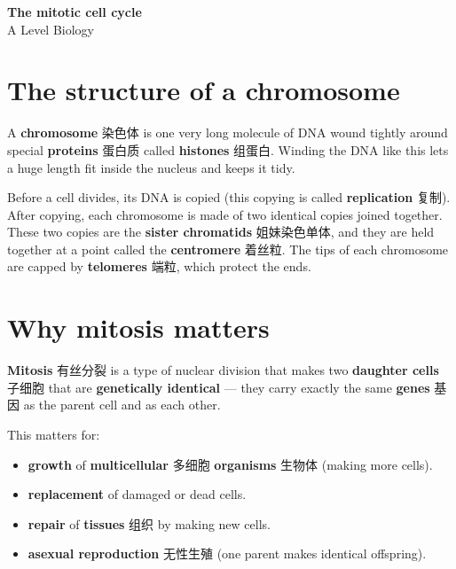 \documentclass[11pt]{article}
\begin{document}
\begin{center}
  {\LARGE\bfseries The mitotic cell cycle}\\[0.35em]
  {\large A Level Biology}
\end{center}
\vspace{0.6em}

\section*{The structure of a chromosome}

A \textbf{chromosome} 染色体 is one very long molecule of DNA wound tightly around special \textbf{proteins} 蛋白质 called \textbf{histones} 组蛋白. Winding the DNA like this lets a huge length fit inside the nucleus and keeps it tidy.

Before a cell divides, its DNA is copied (this copying is called \textbf{replication} 复制). After copying, each chromosome is made of two identical copies joined together. These two copies are the \textbf{sister chromatids} 姐妹染色单体, and they are held together at a point called the \textbf{centromere} 着丝粒. The tips of each chromosome are capped by \textbf{telomeres} 端粒, which protect the ends.

\section*{Why mitosis matters}

\textbf{Mitosis} 有丝分裂 is a type of nuclear division that makes two \textbf{daughter cells} 子细胞 that are \textbf{genetically identical} — they carry exactly the same \textbf{genes} 基因 as the parent cell and as each other.

This matters for:

\begin{itemize}
\item \textbf{growth} of \textbf{multicellular} 多细胞 \textbf{organisms} 生物体 (making more cells).

\item \textbf{replacement} of damaged or dead cells.

\item \textbf{repair} of \textbf{tissues} 组织 by making new cells.

\item \textbf{asexual reproduction} 无性生殖 (one parent makes identical offspring).

\end{itemize}
\end{document}
